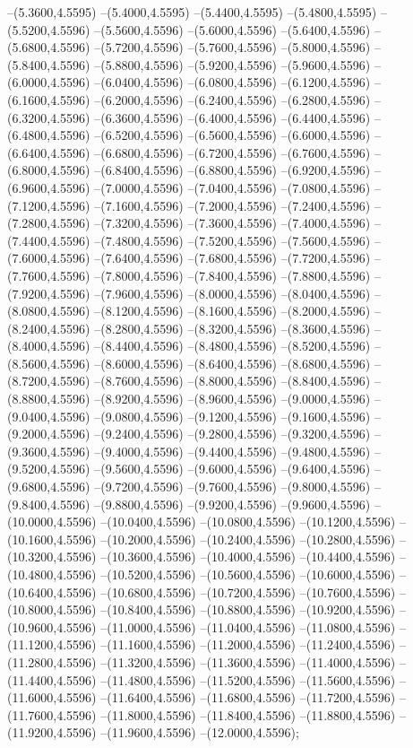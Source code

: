 {	--(5.3600,4.5595)
	--(5.4000,4.5595)
	--(5.4400,4.5595)
	--(5.4800,4.5595)
	--(5.5200,4.5596)
	--(5.5600,4.5596)
	--(5.6000,4.5596)
	--(5.6400,4.5596)
	--(5.6800,4.5596)
	--(5.7200,4.5596)
	--(5.7600,4.5596)
	--(5.8000,4.5596)
	--(5.8400,4.5596)
	--(5.8800,4.5596)
	--(5.9200,4.5596)
	--(5.9600,4.5596)
	--(6.0000,4.5596)
	--(6.0400,4.5596)
	--(6.0800,4.5596)
	--(6.1200,4.5596)
	--(6.1600,4.5596)
	--(6.2000,4.5596)
	--(6.2400,4.5596)
	--(6.2800,4.5596)
	--(6.3200,4.5596)
	--(6.3600,4.5596)
	--(6.4000,4.5596)
	--(6.4400,4.5596)
	--(6.4800,4.5596)
	--(6.5200,4.5596)
	--(6.5600,4.5596)
	--(6.6000,4.5596)
	--(6.6400,4.5596)
	--(6.6800,4.5596)
	--(6.7200,4.5596)
	--(6.7600,4.5596)
	--(6.8000,4.5596)
	--(6.8400,4.5596)
	--(6.8800,4.5596)
	--(6.9200,4.5596)
	--(6.9600,4.5596)
	--(7.0000,4.5596)
	--(7.0400,4.5596)
	--(7.0800,4.5596)
	--(7.1200,4.5596)
	--(7.1600,4.5596)
	--(7.2000,4.5596)
	--(7.2400,4.5596)
	--(7.2800,4.5596)
	--(7.3200,4.5596)
	--(7.3600,4.5596)
	--(7.4000,4.5596)
	--(7.4400,4.5596)
	--(7.4800,4.5596)
	--(7.5200,4.5596)
	--(7.5600,4.5596)
	--(7.6000,4.5596)
	--(7.6400,4.5596)
	--(7.6800,4.5596)
	--(7.7200,4.5596)
	--(7.7600,4.5596)
	--(7.8000,4.5596)
	--(7.8400,4.5596)
	--(7.8800,4.5596)
	--(7.9200,4.5596)
	--(7.9600,4.5596)
	--(8.0000,4.5596)
	--(8.0400,4.5596)
	--(8.0800,4.5596)
	--(8.1200,4.5596)
	--(8.1600,4.5596)
	--(8.2000,4.5596)
	--(8.2400,4.5596)
	--(8.2800,4.5596)
	--(8.3200,4.5596)
	--(8.3600,4.5596)
	--(8.4000,4.5596)
	--(8.4400,4.5596)
	--(8.4800,4.5596)
	--(8.5200,4.5596)
	--(8.5600,4.5596)
	--(8.6000,4.5596)
	--(8.6400,4.5596)
	--(8.6800,4.5596)
	--(8.7200,4.5596)
	--(8.7600,4.5596)
	--(8.8000,4.5596)
	--(8.8400,4.5596)
	--(8.8800,4.5596)
	--(8.9200,4.5596)
	--(8.9600,4.5596)
	--(9.0000,4.5596)
	--(9.0400,4.5596)
	--(9.0800,4.5596)
	--(9.1200,4.5596)
	--(9.1600,4.5596)
	--(9.2000,4.5596)
	--(9.2400,4.5596)
	--(9.2800,4.5596)
	--(9.3200,4.5596)
	--(9.3600,4.5596)
	--(9.4000,4.5596)
	--(9.4400,4.5596)
	--(9.4800,4.5596)
	--(9.5200,4.5596)
	--(9.5600,4.5596)
	--(9.6000,4.5596)
	--(9.6400,4.5596)
	--(9.6800,4.5596)
	--(9.7200,4.5596)
	--(9.7600,4.5596)
	--(9.8000,4.5596)
	--(9.8400,4.5596)
	--(9.8800,4.5596)
	--(9.9200,4.5596)
	--(9.9600,4.5596)
	--(10.0000,4.5596)
	--(10.0400,4.5596)
	--(10.0800,4.5596)
	--(10.1200,4.5596)
	--(10.1600,4.5596)
	--(10.2000,4.5596)
	--(10.2400,4.5596)
	--(10.2800,4.5596)
	--(10.3200,4.5596)
	--(10.3600,4.5596)
	--(10.4000,4.5596)
	--(10.4400,4.5596)
	--(10.4800,4.5596)
	--(10.5200,4.5596)
	--(10.5600,4.5596)
	--(10.6000,4.5596)
	--(10.6400,4.5596)
	--(10.6800,4.5596)
	--(10.7200,4.5596)
	--(10.7600,4.5596)
	--(10.8000,4.5596)
	--(10.8400,4.5596)
	--(10.8800,4.5596)
	--(10.9200,4.5596)
	--(10.9600,4.5596)
	--(11.0000,4.5596)
	--(11.0400,4.5596)
	--(11.0800,4.5596)
	--(11.1200,4.5596)
	--(11.1600,4.5596)
	--(11.2000,4.5596)
	--(11.2400,4.5596)
	--(11.2800,4.5596)
	--(11.3200,4.5596)
	--(11.3600,4.5596)
	--(11.4000,4.5596)
	--(11.4400,4.5596)
	--(11.4800,4.5596)
	--(11.5200,4.5596)
	--(11.5600,4.5596)
	--(11.6000,4.5596)
	--(11.6400,4.5596)
	--(11.6800,4.5596)
	--(11.7200,4.5596)
	--(11.7600,4.5596)
	--(11.8000,4.5596)
	--(11.8400,4.5596)
	--(11.8800,4.5596)
	--(11.9200,4.5596)
	--(11.9600,4.5596)
	--(12.0000,4.5596);
}
